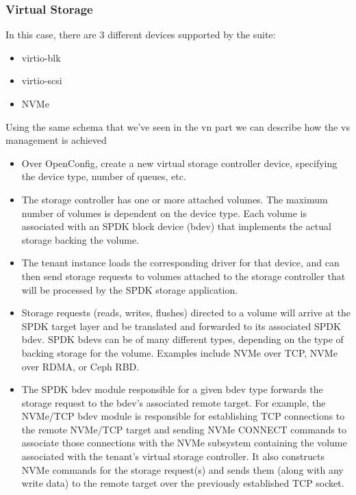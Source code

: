 \documentclass[../sn.tex]{subfiles}
\begin{document}
\subsubsection{Virtual Storage}
In this case, there are 3 different devices supported by the suite:
\begin{itemize}
    \item virtio-blk
    \item virtio-scsi
    \item NVMe
\end{itemize}
Using the same schema that we've seen in the \acrshort{vn} part we can describe how the \acrlong{vs} management is achieved
\begin{itemize}
    \item {} Over OpenConfig, create a new virtual storage controller device, specifying the device type, number of queues, etc.
    \item {} The storage controller has one or more attached volumes.
    The maximum number of volumes is dependent on the device type.
    Each volume is associated with an SPDK block device (bdev) that implements the actual storage backing the volume.
    \item {} The tenant instance loads the corresponding driver for that device, and can then send storage requests to volumes attached to the storage controller that will be processed by the SPDK storage application.
    \item {} Storage requests (reads, writes, flushes) directed to a volume will arrive at the SPDK target layer and be translated and forwarded to its associated SPDK bdev.
    SPDK bdevs can be of many different types, depending on the type of backing storage for the volume.
    Examples include NVMe over TCP, NVMe over RDMA, or Ceph RBD.
    \item {} The SPDK bdev module responsible for a given bdev type forwards the storage request to the bdev's associated remote target. For example, the NVMe/TCP bdev module is responsible for establishing TCP connections to the remote NVMe/TCP target and sending NVMe CONNECT commands to associate those connections with the NVMe subsystem containing the volume associated with the tenant's virtual storage controller. It also constructs NVMe commands for the storage request(s) and sends them (along with any write data) to the remote target over the previously established TCP socket.
\end{itemize}
\clearpage
\end{document}
